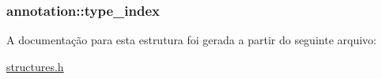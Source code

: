 \subsubsection[{\texorpdfstring{type\+\_\+index}{type_index}}]{ annotation\+::type\+\_\+index}\hypertarget{structannotation_ac1579f92b65639fa8646311a2520e58c}{}\label{structannotation_ac1579f92b65639fa8646311a2520e58c}


A documentação para esta estrutura foi gerada a partir do seguinte arquivo\+:\begin{DoxyCompactItemize}
\item 
\hyperlink{structures_8h}{structures.\+h}\end{DoxyCompactItemize}

